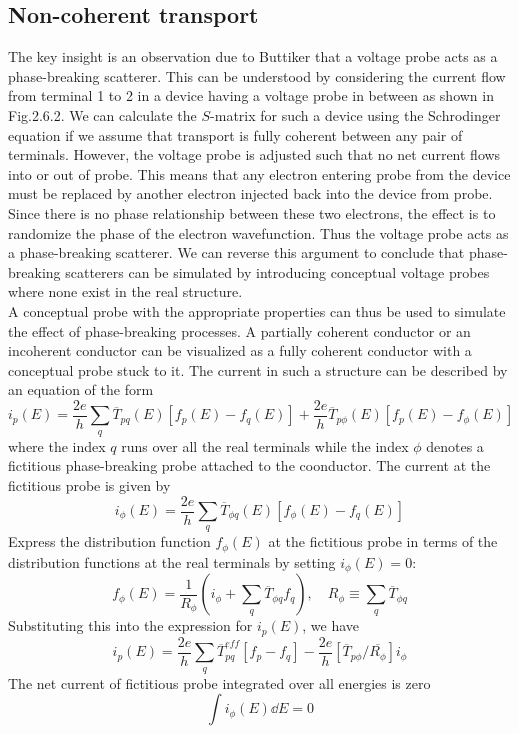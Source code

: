 \documentclass[11pt,a4paper]{book}
\theoremstyle{plain}
\theoremstyle{definition}
\theoremstyle{remark}
\begin{document}
\subsection{Non-coherent transport}
The key insight is an observation due to Buttiker that a voltage probe acts as a phase-breaking scatterer. This can be understood by considering the current flow from terminal 1 to 2 in a device having a voltage probe in between as shown in Fig.2.6.2. We can calculate the $S$-matrix for such a device using the Schrodinger equation if we assume that transport is fully coherent between any pair of terminals. However, the voltage probe is adjusted such that no net current flows into or out of probe. This means that any electron entering probe from the device must be replaced by another electron injected back into the device from probe. Since there is no phase relationship between these two electrons, the effect is to randomize the phase of the electron wavefunction. Thus the voltage probe acts as a phase-breaking scatterer. We can reverse this argument to conclude that phase-breaking scatterers can be simulated by introducing conceptual voltage probes where none exist in the real structure. \\
A conceptual probe with the appropriate properties can thus be used to simulate the effect of phase-breaking processes. A partially coherent conductor or an incoherent conductor can be visualized as a fully coherent conductor with a conceptual probe stuck to it. The current in such a structure can be described by an equation of the form
\begin{equation}
    i_p(E) = \frac{2 e}{h} \sum_q \overline{T}_{pq}(E)\left[ f_p(E) - f_q(E) \right] + \frac{2 e}{h} \overline{T}_{p\phi}(E) \left[ f_p(E) - f_{\phi}(E) \right]
\end{equation}
where the index $q$ runs over all the real terminals while the index $\phi$ denotes a fictitious phase-breaking probe attached to the coonductor. The current at the fictitious probe is given by
\begin{equation}
    i_{\phi}(E) = \frac{2 e}{h} \sum_q \overline{T}_{\phi q}(E) \left[ f_{\phi}(E) - f_q(E) \right]
\end{equation}
Express the distribution function $f_{\phi}(E)$ at the fictitious probe in terms of the distribution functions at the real terminals by setting $i_{\phi}(E) = 0$:
\begin{equation}
    f_{\phi}(E) = \frac{1}{R_\phi} \left( i_\phi + \sum_q \overline{T}_{\phi q} f_q \right), \quad R_\phi \equiv \sum_q \overline{T}_{\phi q}
\end{equation}
Substituting this into the expression for $i_p(E)$, we have
\begin{equation}
    i_p(E) = \frac{2 e}{h} \sum_q \overline{T}_{pq}^{eff}[f_p-f_q]-\frac{2 e}{h} \left[ \overline{T}_{p\phi}/\overline{R_\phi} \right]i_\phi
\end{equation}
The net current of fictitious probe integrated over all energies is zero
\begin{equation}
    \int i_{\phi}(E) \dd E = 0
\end{equation}
\end{document}
